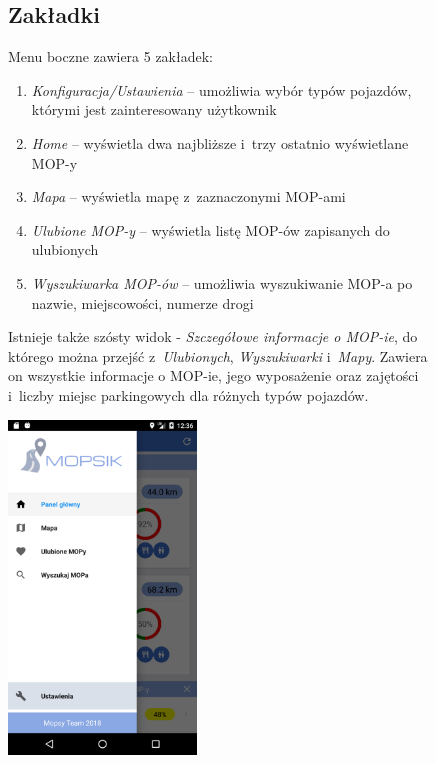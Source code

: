 \begin{figure}[!htb]
\centering
\begin{minipage}{.6\textwidth}
\subsection{Zakładki}
Menu boczne zawiera 5 zakładek: 
\begin{enumerate}
\item \textit{Konfiguracja/Ustawienia} -- umożliwia wybór typów pojazdów, którymi jest zainteresowany użytkownik
\item \textit{Home} -- wyświetla dwa najbliższe i~trzy ostatnio wyświetlane MOP-y
\item \textit{Mapa} -- wyświetla mapę z~zaznaczonymi MOP-ami
\item \textit{Ulubione MOP-y} -- wyświetla listę MOP-ów zapisanych do ulubionych
\item \textit{Wyszukiwarka MOP-ów} -- umożliwia wyszukiwanie MOP-a po nazwie, miejscowości, numerze drogi
\end{enumerate}
Istnieje także szósty widok - \textit{Szczegółowe informacje o MOP-ie}, do którego można przejść z~\textit{Ulubionych}, \textit{Wyszukiwarki} i~\textit{Mapy}. Zawiera on wszystkie informacje o MOP-ie, jego wyposażenie oraz zajętości i~liczby miejsc parkingowych dla różnych typów pojazdów.
\end{minipage}%
\begin{minipage}{.4\textwidth}
  \centering
  \includegraphics[width=5cm]{images/mopsik_mobile/menu.png}
  \label{mopsik_menu}
\end{minipage}
\end{figure}


